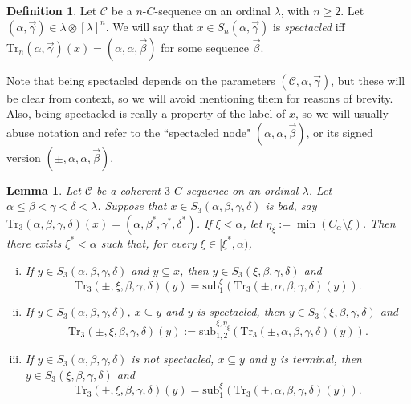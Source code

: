 \documentclass{amsart}
\numberwithin{theorem}{section}
\newtheorem{lemma}[theorem]{Lemma}
\theoremstyle{definition}
\newtheorem{definition}[theorem]{Definition}
\renewcommand{\subset}{\subseteq}
\newcommand{\sub}{\mathrm{sub}}
\newcommand{\C}{\mathcal{C}}
\newcommand{\Tr}{\mathrm{Tr}}
\begin{document}
\begin{definition}\label{spectacled}
Let $\C$ be a $n$-$C$-sequence on an ordinal $\lambda$, with $n\ge 2$. Let 
$(\alpha,\vec{\gamma}) \in \lambda \otimes [\lambda]^n$. We will say that $x\in S_n(\alpha,\vec\gamma)$ is \emph{spectacled} iff $\Tr_n(\alpha,\vec\gamma)(x)=(\alpha,\alpha,\vec\beta)$ for some sequence $\vec\beta$.

Note that being spectacled depends on the parameters $(\C,\alpha,\vec\gamma)$, but these will be clear from context, so we will avoid mentioning them for reasons of brevity. Also, being spectacled is really a property of the label of $x$, so we will usually abuse notation and refer to the ``spectacled node" $(\alpha,\alpha,\vec\beta)$, or its signed version $(\pm,\alpha,\alpha,\vec\beta)$.
\end{definition}

\begin{lemma}\label{badNodes}
Let $\C$ be a coherent $3$-$C$-sequence on an ordinal $\lambda$. Let $\alpha\leq\beta<\gamma<\delta<\lambda$. Suppose that $x\in S_3(\alpha,\beta,\gamma,\delta)$ is bad, say $\Tr_3(\alpha,\beta,\gamma,\delta)(x)=(\alpha,\beta^*,\gamma^*,\delta^*)$. If $\xi<\alpha$, let $\eta_\xi:=\min(C_\alpha\setminus\xi)$. Then there exists $\xi^*<\alpha$ such that, for every $\xi\in [\xi^*,\alpha)$,
\begin{enumerate}[(i)]
\item If $y\in S_3(\alpha,\beta,\gamma,\delta)$ and $y\subset x$, then $y\in S_3(\xi,\beta,\gamma,\delta)$ and
\[
\Tr_3(\pm,\xi,\beta,\gamma,\delta)(y)=\sub_1^\xi(\Tr_3(\pm,\alpha,\beta,\gamma,\delta)(y)).
\]
\item If $y\in S_3(\alpha,\beta,\gamma,\delta)$, $x\subset y$ and $y$ is spectacled, then $y\in S_3(\xi,\beta,\gamma,\delta)$ and
\[
\Tr_3(\pm,\xi,\beta,\gamma,\delta)(y):=\sub_{1,2}^{\xi,\eta_\xi}(\Tr_3(\pm,\alpha,\beta,\gamma,\delta)(y)).
\]
\item If $y\in S_3(\alpha,\beta,\gamma,\delta)$ is not spectacled, $x\subset y$ and $y$ is terminal, then $y\in S_3(\xi,\beta,\gamma,\delta)$ and
\[
\Tr_3(\pm,\xi,\beta,\gamma,\delta)(y)=\sub_1^\xi(\Tr_3(\pm,\alpha,\beta,\gamma,\delta)(y)).
\]
\end{enumerate}
\end{lemma}
\end{document}

